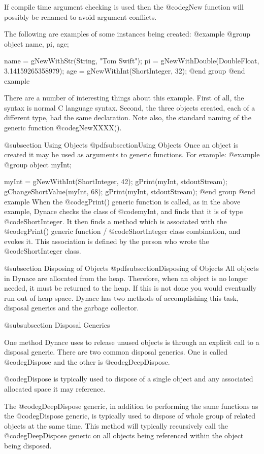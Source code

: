 If compile time argument checking is used then the @code{gNew} function
will possibly be renamed to avoid argument conflicts.

The following are examples of some instances being created:
@example
@group
        object   name, pi, age;

        name = gNewWithStr(String, "Tom Swift");
        pi   = gNewWithDouble(DoubleFloat, 3.14159265358979);
        age  = gNewWithInt(ShortInteger, 32);
@end group
@end example

There are a number of interesting things about this example.  First of
all, the syntax is normal C language syntax.  Second, the three objects
created, each of a different type, had the same declaration.  Note also,
the standard naming of the generic function @code{gNewXXXX()}.

@subsection Using Objects
@pdfsubsection{Using Objects}
Once an object is created it may be used as arguments to generic functions.
For example:
@example
@group
        object   myInt;

        myInt = gNewWithInt(ShortInteger, 42);
        gPrint(myInt, stdoutStream);
        gChangeShortValue(myInt, 68);
        gPrint(myInt, stdoutStream);
@end group
@end example
When the @code{gPrint()} generic function is called, as in the above
example, Dynace checks the class of @code{myInt}, and finds that it is of type
@code{ShortInteger}.  It then finds a method which is associated with the
@code{gPrint()} generic function / @code{ShortInteger} class combination,
and evokes it.  This association is defined by the person who wrote the
@code{ShortInteger} class.

@subsection Disposing of Objects
@pdfsubsection{Disposing of Objects}
All objects in Dynace are allocated from the heap.  Therefore, when an object
is no longer needed, it must be returned to the heap.  If this is not
done you would eventually run out of heap space.  Dynace has two methods
of accomplishing this task, disposal generics and the garbage collector.

@subsubsection Disposal Generics

One method Dynace uses to release unused objects is through an explicit
call to a disposal generic.  There are two common disposal generics.
One is called @code{gDispose} and the other is @code{gDeepDispose}.

@code{gDispose} is typically used to dispose of a single object and any
associated allocated space it may reference.

The @code{gDeepDispose} generic, in addition to performing the same
functions as the @code{gDispose} generic, is typically used to dispose
of whole group of related objects at the same time.  This method will
typically recursively call the @code{gDeepDispose} generic on all
objects being referenced within the object being disposed.

